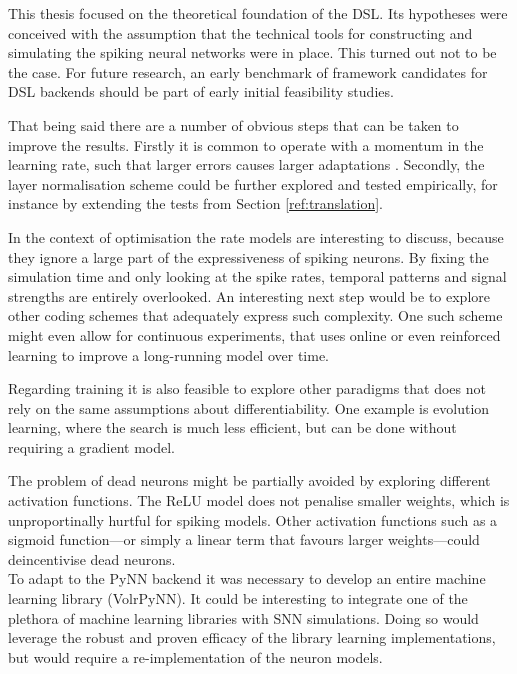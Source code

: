 \documentclass[report.tex]{subfiles}
\begin{document}
This thesis focused on the theoretical foundation of the DSL.
Its hypotheses were conceived with the assumption that the
technical tools for constructing and simulating the spiking neural networks were
in place.
This turned out not to be the case.
For future research, an early benchmark of framework candidates for DSL backends
should be part of early initial feasibility studies.

That being said there are a number of obvious steps that can be taken to improve
the results.
Firstly it is common to operate with a momentum in the learning rate, such that
larger errors causes larger adaptations \cite{Montavon1998, Sutskever2013}.
Secondly, the layer normalisation scheme could be further explored and tested
empirically, for instance by extending the tests from Section
\ref{ref:translation}.

In the context of optimisation the rate models are interesting to discuss,
because they ignore a large part of the expressiveness of spiking neurons.
By fixing the simulation time and only looking at the spike rates,
temporal patterns and signal strengths are entirely overlooked.
An interesting next step would be to explore other coding schemes that
adequately express such complexity. 
One such scheme might even allow for continuous experiments, that uses online or
even reinforced learning to improve a long-running model over time.

Regarding training it is also feasible to explore other paradigms that does not
rely on the same assumptions about differentiability. 
One example is evolution learning, where the search is much less efficient, but
can be done without requiring a gradient model.

The problem of dead neurons might be partially avoided by exploring different
activation functions. 
The ReLU model does not penalise smaller weights, which is
unproportinally hurtful for spiking models.
Other activation functions such as a sigmoid function---or simply a linear term
that favours larger weights---could deincentivise dead neurons.
\\[0.1cm]

To adapt to the PyNN backend it was necessary to develop an entire machine
learning library (VolrPyNN). 
It could be interesting to integrate one of the plethora of machine
learning libraries with \gls{SNN} simulations.
Doing so would leverage the robust and proven efficacy of the library learning
implementations, but would require a re-implementation of the neuron models.
\end{document}
